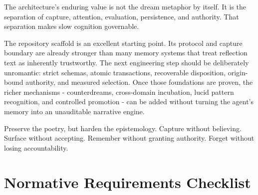 \documentclass[11pt,a4paper]{article}
\begin{document}
The architecture's enduring value is not the dream metaphor by itself. It is the separation of capture, attention, evaluation, persistence, and authority. That separation makes slow cognition governable.

The repository scaffold is an excellent starting point. Its protocol and capture boundary are already stronger than many memory systems that treat reflection text as inherently trustworthy. The next engineering step should be deliberately unromantic: strict schemas, atomic transactions, recoverable disposition, origin-bound authority, and measured selection. Once those foundations are proven, the richer mechanisms - counterdreams, cross-domain incubation, lucid pattern recognition, and controlled promotion - can be added without turning the agent's memory into an unauditable narrative engine.

\begin{keybox}
Preserve the poetry, but harden the epistemology. Capture without believing. Surface without accepting. Remember without granting authority. Forget without losing accountability.
\end{keybox}

\appendix

\section{Normative Requirements Checklist}
\end{document}
